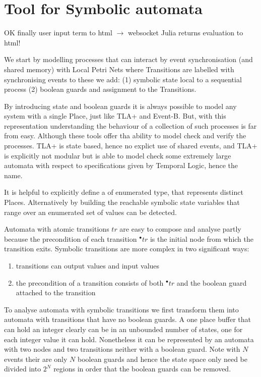 \section{Tool for Symbolic automata}

OK finally user input term to html $\rightarrow$ websocket Julia  returns evaluation to html!





We start by modelling processes that can interact by event synchronisation (and shared memory) with Local Petri Nets where Transitions are labelled with synchronising events to these we add: (1) symbolic state  local to a sequential process (2) boolean guards and assignment to the Transitions.


By introducing state and boolean guards it is always possible to model any system with a single Place, just like TLA+ and Event-B. But, with this representation understanding the behaviour of a collection of such processes is far from easy. Although these tools offer tha ability to model check and verify the processes. TLA+ is state based, hence no explict use of shared events, and  TLA+ is explicitly not modular but is able to model check some extremely large automata  with respect to specifications given by Temporal Logic, hence the name. 

It is helpful to explicitly define a  of enumerated type, that represents distinct Places. Alternatively by  building the reachable symbolic state variables that range over an enumerated set of values can be detected.
 
Automata with atomic transitions $tr$ are easy to compose and analyse partly because the precondition of each transition $^{\bullet}tr$ is the initial node from which the transition exits. Symbolic transitions are more complex in  two significant ways:
\begin{enumerate}
\item transitions can output values and input values
\item the precondition of a transition consists of both $^{\bullet}tr$  and  the  boolean guard attached to the transition
\end{enumerate}

To analyse  automata with symbolic transitions we  first transform them into automata with  transitions that have no boolean guards. A one place buffer that can hold an integer clearly can be in  an unbounded  number of states, one for each integer value it can hold. Nonetheless it can be represented by an automata with two nodes and two transitions neither with a boolean guard. Note with $N$ events their are only $N$ boolean guards and hence the state space only need be divided into $2^N$ regions in order that the boolean guards can be removed.


